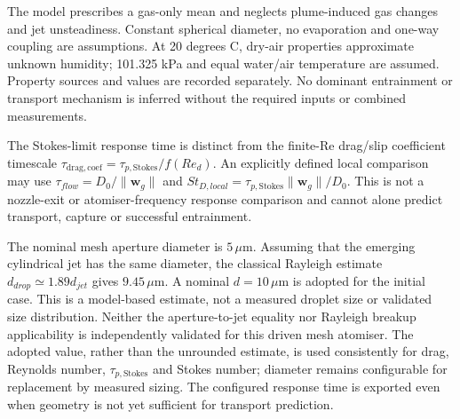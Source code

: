 The model prescribes a gas-only mean and neglects plume-induced gas changes and
jet unsteadiness. Constant spherical diameter, no evaporation and one-way coupling
are assumptions. At 20 degrees C, dry-air properties approximate unknown humidity;
101.325 kPa and equal water/air temperature are assumed. Property sources and
values are recorded separately. No dominant entrainment or transport mechanism
is inferred without the required inputs or combined measurements.

The Stokes-limit response time is distinct from the finite-Re drag/slip coefficient
timescale $\tau_{\mathrm{drag,coef}}=\tau_{p,\mathrm{Stokes}}/f(Re_d)$.
An explicitly defined local comparison may use $\tau_{flow}=D_0/\lVert\boldsymbol w_g\rVert$
and $St_{D,local}=\tau_{p,\mathrm{Stokes}}\lVert\boldsymbol w_g\rVert/D_0$.
This is not a nozzle-exit or atomiser-frequency response comparison and cannot
alone predict transport, capture or successful entrainment.

The nominal mesh aperture diameter is $5\,\mu\mathrm{m}$. Assuming that the
emerging cylindrical jet has the same diameter, the classical Rayleigh estimate
$d_{drop}\simeq1.89d_{jet}$ gives $9.45\,\mu\mathrm{m}$. A nominal
$d=10\,\mu\mathrm{m}$ is adopted for the initial case. This is a model-based
estimate, not a measured droplet size or validated size distribution. Neither
the aperture-to-jet equality nor Rayleigh breakup applicability is independently
validated for this driven mesh atomiser. The adopted value, rather than the
unrounded estimate, is used consistently for drag, Reynolds number,
$\tau_{p,\mathrm{Stokes}}$ and Stokes number; diameter remains configurable
for replacement by measured sizing. The configured response time is exported
even when geometry is not yet sufficient for transport prediction.
